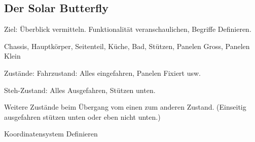 %
%
%

\subsection{Der Solar Butterfly}
Ziel: Überblick vermitteln. Funktionalität veranschaulichen, Begriffe Definieren.

Chassis, Hauptkörper, Seitenteil, Küche, Bad, Stützen, Panelen Gross, Panelen Klein

Zustände:
Fahrzustand:
Alles eingefahren, Panelen Fixiert usw.


Steh-Zustand:
Alles Ausgefahren, Stützen unten.

Weitere Zustände beim Übergang vom einen zum anderen Zustand. (Einseitig ausgefahren stützen unten oder eben nicht unten.)

Koordinatensystem Definieren
\newpage
